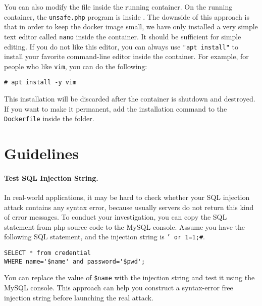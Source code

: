 You can also modify the file inside the running container.
On the running container, the \texttt{unsafe.php} program is 
inside . 
The downside of this
approach is that in order to keep the docker image small,
we have only installed a very simple text editor called \texttt{nano}
inside the container. It should be sufficient for simple editing.
If you do not like this editor, you can always use \texttt{"apt install"} to install
your favorite command-line editor inside the container. For example,
for people who like \texttt{vim}, you can do the following:

\begin{lstlisting}
# apt install -y vim 
\end{lstlisting}

This installation will be discarded after the container is shutdown and destroyed.
If you want to make it permanent, add the installation command to the \texttt{Dockerfile} 
inside the  folder. 
 


\section{Guidelines}
\label{sec:guidelines}

\paragraph{Test SQL Injection String.}
In real-world applications, it may be hard to check whether your SQL injection attack contains
any syntax error, because usually servers do not return this kind of error messages. 
To conduct your investigation, you can copy the SQL statement from php source code to the MySQL console. 
Assume you have the following SQL statement, and the injection string is {\tt ' or 1=1;\#}. 

\begin{lstlisting}
SELECT * from credential 
WHERE name='$name' and password='$pwd';
\end{lstlisting}

You can replace the value of {\tt \$name} with the
injection string and test it using the MySQL console. 
This approach can help you construct a syntax-error 
free injection string before launching the real attack. 



